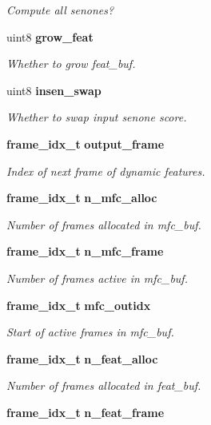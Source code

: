 \begin{DoxyCompactItemize}
\begin{DoxyCompactList}\small\item\em Compute all senones? \end{DoxyCompactList}\item 
uint8 {\bf grow\-\_\-feat}
\begin{DoxyCompactList}\small\item\em Whether to grow feat\-\_\-buf. \end{DoxyCompactList}\item 
uint8 {\bf insen\-\_\-swap}
\begin{DoxyCompactList}\small\item\em Whether to swap input senone score. \end{DoxyCompactList}\item 
{\bf frame\-\_\-idx\-\_\-t} {\bf output\-\_\-frame}
\begin{DoxyCompactList}\small\item\em Index of next frame of dynamic features. \end{DoxyCompactList}\item 
{\bf frame\-\_\-idx\-\_\-t} {\bf n\-\_\-mfc\-\_\-alloc}\label{structacmod__s_af4fa71ce8be75356a1f472959a9ff6d1}

\begin{DoxyCompactList}\small\item\em Number of frames allocated in mfc\-\_\-buf. \end{DoxyCompactList}\item 
{\bf frame\-\_\-idx\-\_\-t} {\bf n\-\_\-mfc\-\_\-frame}\label{structacmod__s_a1c5d63882997211e57ed698e33080958}

\begin{DoxyCompactList}\small\item\em Number of frames active in mfc\-\_\-buf. \end{DoxyCompactList}\item 
{\bf frame\-\_\-idx\-\_\-t} {\bf mfc\-\_\-outidx}\label{structacmod__s_afc6ef051f5de03c3f51aa740ff10a99b}

\begin{DoxyCompactList}\small\item\em Start of active frames in mfc\-\_\-buf. \end{DoxyCompactList}\item 
{\bf frame\-\_\-idx\-\_\-t} {\bf n\-\_\-feat\-\_\-alloc}\label{structacmod__s_a8269cb11354683ba83f1994b46e15466}

\begin{DoxyCompactList}\small\item\em Number of frames allocated in feat\-\_\-buf. \end{DoxyCompactList}\item 
{\bf frame\-\_\-idx\-\_\-t} {\bf n\-\_\-feat\-\_\-frame}\label{structacmod__s_a861cc097befe7e81473f0ae0972186e0}


\end{DoxyCompactItemize}
